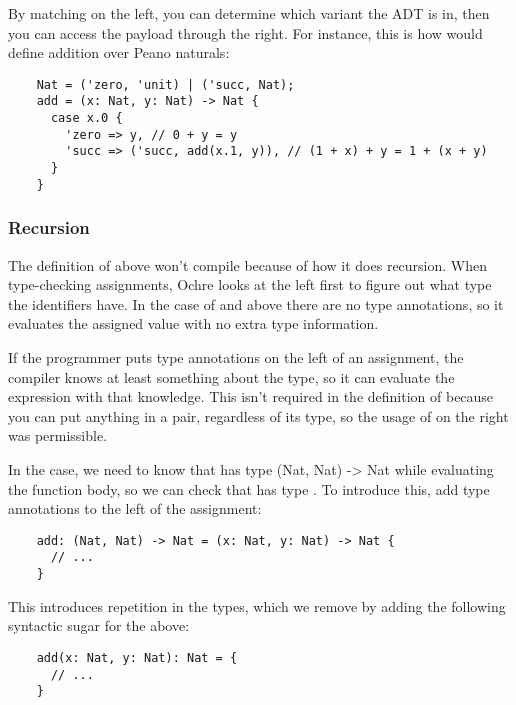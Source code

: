 \documentclass[12pt,twoside]{report}
\begin{document}
By matching on the left, you can determine which variant the ADT is in, then you can access the payload through the right. For instance, this is how would define addition over Peano naturals:

\begin{listing}[H]
  \begin{verbatim}
    Nat = ('zero, 'unit) | ('succ, Nat);
    add = (x: Nat, y: Nat) -> Nat {
      case x.0 {
        'zero => y, // 0 + y = y
        'succ => ('succ, add(x.1, y)), // (1 + x) + y = 1 + (x + y)
      }
    }
  \end{verbatim}
\end{listing}

\subsubsection{Recursion}

The definition of  above won't compile because of how it does recursion. When type-checking assignments, Ochre looks at the left first to figure out what type the identifiers have. In the case of  and  above there are no type annotations, so it evaluates the assigned value with no extra type information.

If the programmer puts type annotations on the left of an assignment, the compiler knows at least something about the type, so it can evaluate the expression with that knowledge. This isn't required in the definition of  because you can put anything in a pair, regardless of its type, so the usage of  on the right was permissible.

In the  case, we need to know that  has type {(Nat, Nat) -> Nat} while evaluating the function body, so we can check that  has type . To introduce this, add type annotations to the left of the assignment:

\begin{listing}[H]
  \begin{verbatim}
    add: (Nat, Nat) -> Nat = (x: Nat, y: Nat) -> Nat {
      // ...
    }
  \end{verbatim}
\end{listing}

This introduces repetition in the types, which we remove by adding the following syntactic sugar for the above:

\begin{listing}[H]
  \begin{verbatim}
    add(x: Nat, y: Nat): Nat = {
      // ...
    }
  \end{verbatim}
\end{listing}
\end{document}
